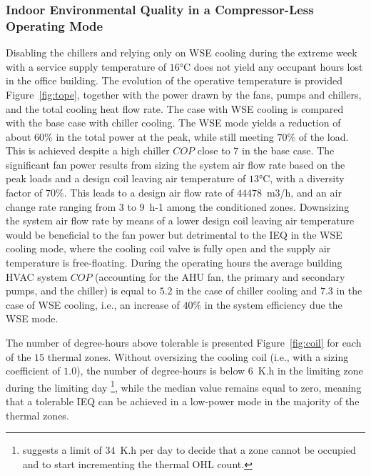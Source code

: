 \subsubsection{Indoor Environmental Quality in a Compressor-Less Operating Mode} \label{sec:ieq}

Disabling the chillers and relying only on WSE cooling during the extreme week with a service supply temperature of $16$°C does not yield any occupant hours lost in the office building.
The evolution of the operative temperature is provided Figure~\ref{fig:tope}, together with the power drawn by the fans, pumps and chillers, and the total cooling heat flow rate. The case with WSE cooling is compared with the base case with chiller cooling.
The WSE mode yields a reduction of about $60\%$ in the total power at the peak, while still meeting $70\%$ of the load.
This is achieved despite a high chiller $COP$ close to $7$ in the base case.
The significant fan power results from sizing the system air flow rate based on the peak loads and a design coil leaving air temperature of $13$°C, with a diversity factor of $70\%$. This leads to a design air flow rate of $44478$~m3/h, and an air change rate ranging from $3$ to $9$~h-1 among the conditioned zones. Downsizing the system air flow rate by means of a lower design coil leaving air temperature would be beneficial to the fan power but detrimental to the IEQ in the WSE cooling mode, where the cooling coil valve is fully open and the supply air temperature is free-floating.
During the operating hours the average building HVAC system $COP$ (accounting for the AHU fan, the primary and secondary pumps, and the chiller) is equal to $5.2$ in the case of chiller cooling and $7.3$ in the case of WSE cooling, i.e., an increase of $40\%$ in the system efficiency due the WSE mode.

The number of degree-hours above tolerable is presented Figure~\ref{fig:coil} for each of the $15$ thermal zones.
Without oversizing the cooling coil (i.e., with a sizing coefficient of $1.0$), the number of degree-hours is below $6$~K.h in the limiting zone during the limiting day%
\footnote{%
\cite{Mathew2021} suggests a limit of $34$~K.h per day to decide that a zone cannot be occupied and to start incrementing the thermal OHL count.}, while the median value remains equal to zero, meaning that a tolerable IEQ can be achieved in a low-power mode in the majority of the thermal zones.

